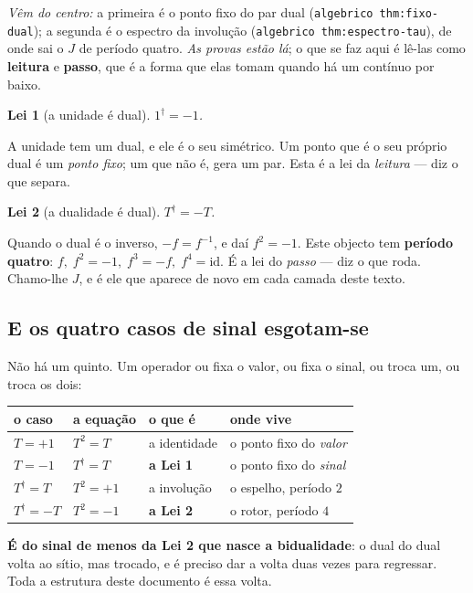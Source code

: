 \documentclass[11pt,a4paper]{article}
\newcommand{\code}[1]{\texttt{\small #1}}
\newtheorem{lei}{Lei}
\newcommand{\dg}{^{\dagger}}
\begin{document}
\noindent\emph{Vêm do centro:} a primeira é o ponto fixo do par dual
(\code{algebrico thm:fixo-dual}); a segunda é o espectro da involução
(\code{algebrico thm:espectro-tau}), de onde sai o $J$ de período quatro. \emph{As provas
estão lá}; o que se faz aqui é lê-las como \textbf{leitura} e \textbf{passo}, que é a forma
que elas tomam quando há um contínuo por baixo.

\begin{lei}[a unidade é dual]
$1\dg=-1$.
\end{lei}

\noindent A unidade tem um dual, e ele é o seu simétrico. Um ponto que é o seu próprio dual é um
\emph{ponto fixo}; um que não é, gera um par. Esta é a lei da \emph{leitura} --- diz o que separa.

\begin{lei}[a dualidade é dual]
$T\dg=-T$.
\end{lei}

\noindent Quando o dual é o inverso, $-f=f^{-1}$, e daí $f^2=-1$. Este objecto tem \textbf{período
quatro}: $f,\;f^2=-1,\;f^3=-f,\;f^4=\mathrm{id}$. É a lei do \emph{passo} --- diz o que roda. Chamo-lhe
$J$, e é ele que aparece de novo em cada camada deste texto.

\subsection*{E os quatro casos de sinal esgotam-se}

Não há um quinto. Um operador ou fixa o valor, ou fixa o sinal, ou troca um, ou troca os dois:

\begin{center}\small
\begin{tabular}{@{}llll@{}}
\toprule
o caso & a equação & o que é & onde vive \\
\midrule
$T=+1$   & $T^2=T$   & a identidade   & o ponto fixo do \emph{valor} \\
$T=-1$   & $T\dg=T$  & \textbf{a Lei 1} & o ponto fixo do \emph{sinal} \\
$T\dg=T$ & $T^2=+1$  & a involução    & o espelho, período $2$ \\
$T\dg=-T$& $T^2=-1$  & \textbf{a Lei 2} & o rotor, período $4$ \\
\bottomrule
\end{tabular}
\end{center}

\noindent \textbf{É do sinal de menos da Lei 2 que nasce a bidualidade}: o dual do dual volta ao
sítio, mas trocado, e é preciso dar a volta duas vezes para regressar. Toda a estrutura deste
documento é essa volta.
\end{document}
